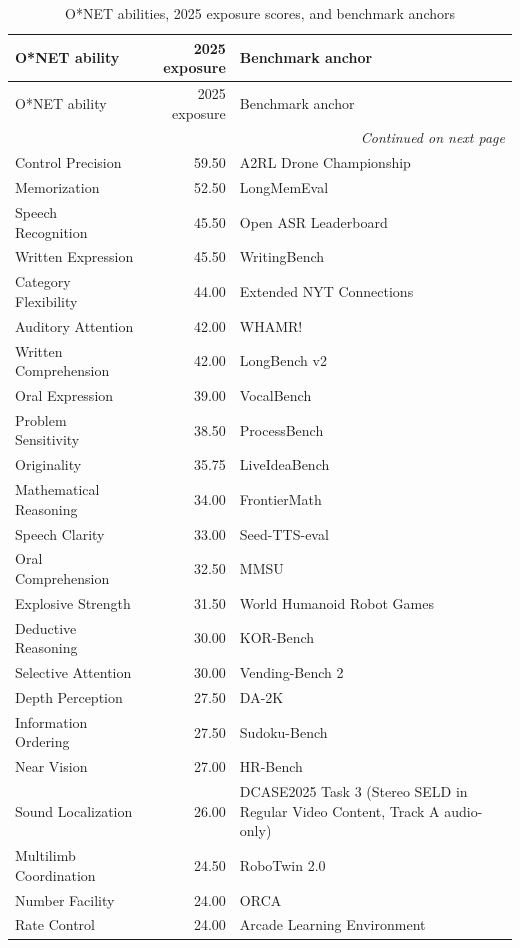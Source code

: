 \begin{longtable}{lrp{7cm}}
\caption{O*NET abilities, 2025 exposure scores, and benchmark anchors}\label{tab:anchors} \\ \toprule
O*NET ability & 2025 exposure & Benchmark anchor \\ \midrule \endfirsthead
\toprule O*NET ability & 2025 exposure & Benchmark anchor \\ \midrule \endhead
\midrule \multicolumn{3}{r}{\textit{Continued on next page}} \\ \endfoot
\bottomrule \endlastfoot
Control Precision & 59.50 & A2RL Drone Championship \\
Memorization & 52.50 & LongMemEval \\
Speech Recognition & 45.50 & Open ASR Leaderboard \\
Written Expression & 45.50 & WritingBench \\
Category Flexibility & 44.00 & Extended NYT Connections \\
Auditory Attention & 42.00 & WHAMR! \\
Written Comprehension & 42.00 & LongBench v2 \\
Oral Expression & 39.00 & VocalBench \\
Problem Sensitivity & 38.50 & ProcessBench \\
Originality & 35.75 & LiveIdeaBench \\
Mathematical Reasoning & 34.00 & FrontierMath \\
Speech Clarity & 33.00 & Seed-TTS-eval \\
Oral Comprehension & 32.50 & MMSU \\
Explosive Strength & 31.50 & World Humanoid Robot Games \\
Deductive Reasoning & 30.00 & KOR-Bench \\
Selective Attention & 30.00 & Vending-Bench 2 \\
Depth Perception & 27.50 & DA-2K \\
Information Ordering & 27.50 & Sudoku-Bench \\
Near Vision & 27.00 & HR-Bench \\
Sound Localization & 26.00 & DCASE2025 Task 3 (Stereo SELD in Regular Video Content, Track A audio-only) \\
Multilimb Coordination & 24.50 & RoboTwin 2.0 \\
Number Facility & 24.00 & ORCA \\
Rate Control & 24.00 & Arcade Learning Environment \\

\end{longtable}
